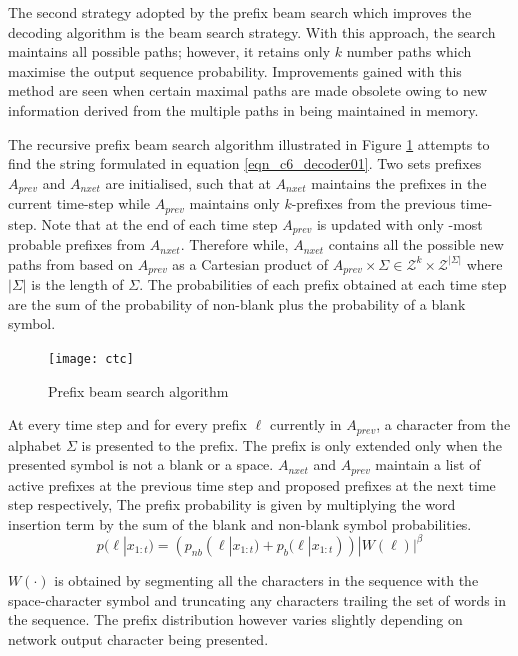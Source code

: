 The second strategy adopted by the prefix beam search which improves the decoding algorithm is the beam search strategy.  With this approach, the search maintains all possible paths; however, it retains only $k$ number paths which maximise the output sequence probability.  Improvements gained with this method are seen when certain maximal paths are made obsolete owing to new information derived from the multiple paths in being maintained in memory. 

The recursive prefix beam search algorithm illustrated in Figure \ref{fig_c6_decoder01} attempts to find the string formulated in equation \ref{eqn_c6_decoder01}.  Two sets prefixes $A_{prev}$ and $A_{nxet}$ are initialised, such that at $A_{nxet}$ maintains the prefixes in the current time-step while $A_{prev}$ maintains only $k$-prefixes from the previous time-step.  Note that at the end of each time step $A_{prev}$ is updated with only -most probable prefixes from $A_{nxet}$. Therefore while,  $A_{nxet}$ contains all the possible new paths from based on $A_{prev}$ as a Cartesian product of $A_{prev} \times \Sigma \in \mathcal{Z}^k\times\mathcal{Z}^{|\Sigma|}$ where $|\Sigma|$ is the length of $\Sigma$. The probabilities of each prefix obtained at each time step are the sum of the probability of non-blank plus the probability of a blank symbol.
\begin{figure}
    \texttt{[image: ctc]}
    \caption{Prefix beam search algorithm}
    \label{fig_c6_decoder01}
\end{figure}

At every  time step and for every prefix $\ell$ currently in $A_{prev}$, a character from the alphabet $\Sigma$ is presented to the prefix. The prefix is only extended only when the presented symbol is not a blank or a space. $A_{nxet}$ and $A_{prev}$ maintain a list of active prefixes at the previous time step and proposed prefixes at the next time step respectively, The prefix probability is given by multiplying the word insertion term by the sum of the blank and non-blank symbol probabilities.
\begin{equation}
p(\ell|x_{1:t})=(p_{nb}(\ell|x_{1:t})+p_b(\ell|x_{1:t}))|W(\ell)|^\beta
\label{eqn_c6_decoder03}
\end{equation}

$W(\cdot)$ is obtained by segmenting all the characters in the sequence with the space-character symbol and truncating any characters trailing the  set of words in the sequence.  The prefix distribution however varies slightly depending on network output character being presented.

